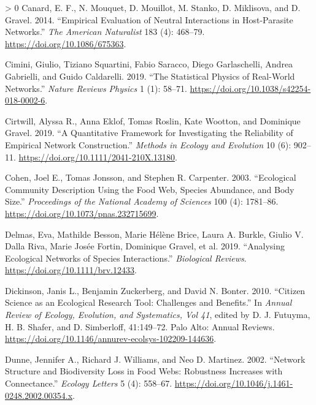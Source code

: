 \documentclass[10pt,oneside]{article}
\newlength{\cslhangindent}
\newenvironment{CSLReferences}[3] %
 {%
  \setlength{\parindent}{0pt}
  \ifodd #1 \everypar{\setlength{\hangindent}{\cslhangindent}}\ignorespaces\fi
  \ifnum #2 > 0
  \setlength{\parskip}{#2\baselineskip}
  \fi
 }%
 {}
\begin{document}
\begin{CSLReferences}{1}{0}
\leavevmode\hypertarget{ref-Canard2014EmpEva}{}%
Canard, E. F., N. Mouquet, D. Mouillot, M. Stanko, D. Miklisova, and D.
Gravel. 2014. {``Empirical Evaluation of Neutral Interactions in
Host-Parasite Networks.''} \emph{The American Naturalist} 183 (4):
468--79. \url{https://doi.org/10.1086/675363}.

\leavevmode\hypertarget{ref-Cimini2019StaPhy}{}%
Cimini, Giulio, Tiziano Squartini, Fabio Saracco, Diego Garlaschelli,
Andrea Gabrielli, and Guido Caldarelli. 2019. {``The Statistical Physics
of Real-World Networks.''} \emph{Nature Reviews Physics} 1 (1): 58--71.
\url{https://doi.org/10.1038/s42254-018-0002-6}.

\leavevmode\hypertarget{ref-Cirtwill2019QuaFrac}{}%
Cirtwill, Alyssa R., Anna Eklof, Tomas Roslin, Kate Wootton, and
Dominique Gravel. 2019. {``A Quantitative Framework for Investigating
the Reliability of Empirical Network Construction.''} \emph{Methods in
Ecology and Evolution} 10 (6): 902--11.
\url{https://doi.org/10.1111/2041-210X.13180}.

\leavevmode\hypertarget{ref-Cohen2003EcoComa}{}%
Cohen, Joel E., Tomas Jonsson, and Stephen R. Carpenter. 2003.
{``Ecological Community Description Using the Food Web, Species
Abundance, and Body Size.''} \emph{Proceedings of the National Academy
of Sciences} 100 (4): 1781--86.
\url{https://doi.org/10.1073/pnas.232715699}.

\leavevmode\hypertarget{ref-Delmas2019AnaEco}{}%
Delmas, Eva, Mathilde Besson, Marie Hélène Brice, Laura A. Burkle,
Giulio V. Dalla Riva, Marie Josée Fortin, Dominique Gravel, et al. 2019.
{``Analysing Ecological Networks of Species Interactions.''}
\emph{Biological Reviews}. \url{https://doi.org/10.1111/brv.12433}.

\leavevmode\hypertarget{ref-Dickinson2010CitSci}{}%
Dickinson, Janis L., Benjamin Zuckerberg, and David N. Bonter. 2010.
{``Citizen Science as an Ecological Research Tool: Challenges and
Benefits.''} In \emph{Annual Review of Ecology, Evolution, and
Systematics, Vol 41}, edited by D. J. Futuyma, H. B. Shafer, and D.
Simberloff, 41:149--72. Palo Alto: Annual Reviews.
\url{https://doi.org/10.1146/annurev-ecolsys-102209-144636}.

\leavevmode\hypertarget{ref-Dunne2002NetStrb}{}%
Dunne, Jennifer A., Richard J. Williams, and Neo D. Martinez. 2002.
{``Network Structure and Biodiversity Loss in Food Webs: Robustness
Increases with Connectance.''} \emph{Ecology Letters} 5 (4): 558--67.
\url{https://doi.org/10.1046/j.1461-0248.2002.00354.x}.


\end{CSLReferences}
\end{document}
